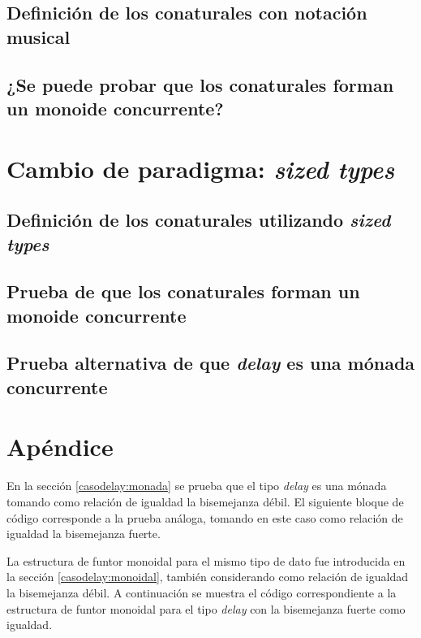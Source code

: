 \subsection{Definición de los conaturales con notación musical}

\subsection{¿Se puede probar que los conaturales forman un monoide concurrente?}

\section{Cambio de paradigma: \textit{sized types}}

\subsection{Definición de los conaturales utilizando \textit{sized types}}

\subsection{Prueba de que los conaturales forman un monoide concurrente}

\subsection{Prueba alternativa de que \textit{delay} es una mónada concurrente}

\section*{Apéndice}\label{casodelay:apendice}

En la sección \ref{casodelay:monada} se prueba que el tipo \textit{delay} es una mónada tomando como relación de igualdad la bisemejanza débil. El siguiente bloque de código corresponde a la prueba análoga, tomando en este caso como relación de igualdad la bisemejanza fuerte. 


La estructura de funtor monoidal para el mismo tipo de dato fue introducida en la sección \ref{casodelay:monoidal}, también considerando como relación de igualdad la bisemejanza débil. A continuación se muestra el código correspondiente a la estructura de funtor monoidal para el tipo \textit{delay} con la bisemejanza fuerte como igualdad.

